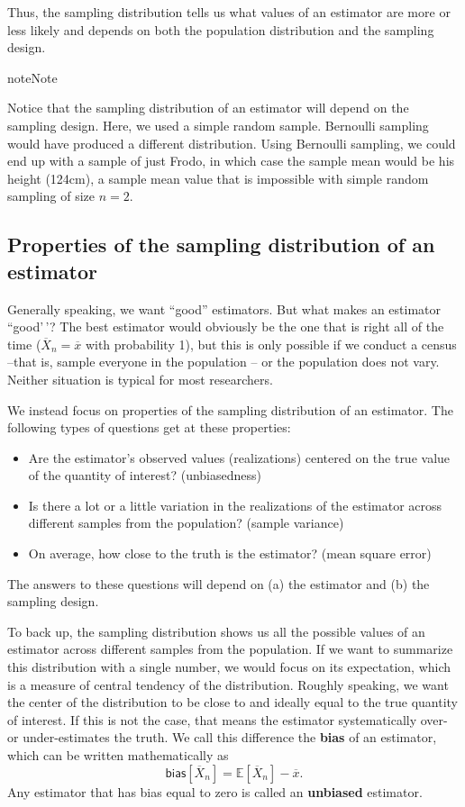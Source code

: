 \documentclass[
  13pt,
  letterpaper,
  DIV=11,
  numbers=noendperiod]{scrreprt}
\providecommand{\tightlist}{%
  \setlength{\itemsep}{0pt}\setlength{\parskip}{0pt}}
\newcommand{\E}{\mathbb{E}}
\newcommand{\Xbar}{\overline{X}}
\theoremstyle{plain}
\theoremstyle{plain}
\theoremstyle{definition}
\theoremstyle{definition}
\theoremstyle{remark}
\begin{document}
Thus, the sampling distribution tells us what values of an estimator are
more or less likely and depends on both the population distribution and
the sampling design.

\begin{bookcallout}{note}{Note}

Notice that the sampling distribution of an estimator will depend on the
sampling design. Here, we used a simple random sample. Bernoulli
sampling would have produced a different distribution. Using Bernoulli
sampling, we could end up with a sample of just Frodo, in which case the
sample mean would be his height (124cm), a sample mean value that is
impossible with simple random sampling of size \(n=2\).

\end{bookcallout}

\subsection{Properties of the sampling distribution of an
estimator}\label{sec-design-properties}

Generally speaking, we want ``good'' estimators. But what makes an
estimator ``good'\,'? The best estimator would obviously be the one that
is right all of the time (\(\Xbar_n = \overline{x}\) with probability
1), but this is only possible if we conduct a census --that is, sample
everyone in the population -- or the population does not vary. Neither
situation is typical for most researchers.

We instead focus on properties of the sampling distribution of an
estimator. The following types of questions get at these properties:

\begin{itemize}
\tightlist
\item
  Are the estimator's observed values (realizations) centered on the
  true value of the quantity of interest? (unbiasedness)
\item
  Is there a lot or a little variation in the realizations of the
  estimator across different samples from the population? (sample
  variance)
\item
  On average, how close to the truth is the estimator? (mean square
  error)
\end{itemize}

The answers to these questions will depend on (a) the estimator and (b)
the sampling design.

To back up, the sampling distribution shows us all the possible values
of an estimator across different samples from the population. If we want
to summarize this distribution with a single number, we would focus on
its expectation, which is a measure of central tendency of the
distribution. Roughly speaking, we want the center of the distribution
to be close to and ideally equal to the true quantity of interest. If
this is not the case, that means the estimator systematically over- or
under-estimates the truth. We call this difference the \textbf{bias} of
an estimator, which can be written mathematically as \[
\textsf{bias}[\Xbar_{n}] = \E[\Xbar_{n}] - \overline{x}.
\] Any estimator that has bias equal to zero is called an
\textbf{unbiased} estimator.
\end{document}
